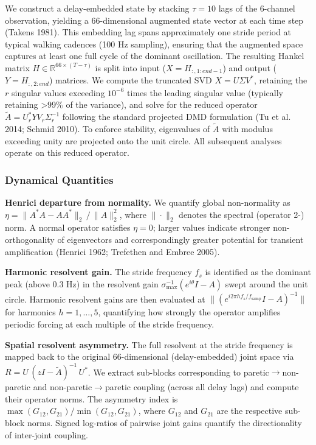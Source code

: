 \documentclass[
  letterpaper,
  DIV=11,
  numbers=noendperiod]{scrartcl}
\begin{document}
We construct a delay-embedded state by stacking \(\tau = 10\) lags of
the 6-channel observation, yielding a \(66\)-dimensional augmented state
vector at each time step (Takens 1981). This embedding lag spans
approximately one stride period at typical walking cadences (100 Hz
sampling), ensuring that the augmented space captures at least one full
cycle of the dominant oscillation. The resulting Hankel matrix
\(H \in \mathbb{R}^{66 \times (T - \tau)}\) is split into input
(\(X = H_{:,1:end-1}\)) and output (\(Y = H_{:,2:end}\)) matrices. We
compute the truncated SVD \(X = U \Sigma V^*\), retaining the \(r\)
singular values exceeding \(10^{-6}\) times the leading singular value
(typically retaining \textgreater99\% of the variance), and solve for
the reduced operator \(\tilde{A} = U_r^* Y V_r \Sigma_r^{-1}\) following
the standard projected DMD formulation (Tu et al. 2014; Schmid 2010). To
enforce stability, eigenvalues of \(\tilde{A}\) with modulus exceeding
unity are projected onto the unit circle. All subsequent analyses
operate on this reduced operator.

\subsubsection{Dynamical Quantities}\label{dynamical-quantities}

\textbf{Henrici departure from normality.} We quantify global
non-normality as \(\eta = \|A^* A - A A^*\|_2 \,/\, \|A\|_2^2\), where
\(\|\cdot\|_2\) denotes the spectral (operator 2-) norm. A normal
operator satisfies \(\eta = 0\); larger values indicate stronger
non-orthogonality of eigenvectors and correspondingly greater potential
for transient amplification (Henrici 1962; Trefethen and Embree 2005).

\textbf{Harmonic resolvent gain.} The stride frequency \(f_s\) is
identified as the dominant peak (above 0.3 Hz) in the resolvent gain
\(\sigma_{\max}^{-1}(e^{i\theta}I - A)\) swept around the unit circle.
Harmonic resolvent gains are then evaluated at
\(\|(e^{i 2\pi h f_s / f_{\text{samp}}} I - A)^{-1}\|\) for harmonics
\(h = 1, \ldots, 5\), quantifying how strongly the operator amplifies
periodic forcing at each multiple of the stride frequency.

\textbf{Spatial resolvent asymmetry.} The full resolvent at the stride
frequency is mapped back to the original \(66\)-dimensional
(delay-embedded) joint space via
\(R = U \,(z I - \tilde{A})^{-1}\, U^*\). We extract sub-blocks
corresponding to paretic\(\to\)non-paretic and non-paretic\(\to\)paretic
coupling (across all delay lags) and compute their operator norms. The
asymmetry index is \(\max(G_{12}, G_{21}) / \min(G_{12}, G_{21})\),
where \(G_{12}\) and \(G_{21}\) are the respective sub-block norms.
Signed log-ratios of pairwise joint gains quantify the directionality of
inter-joint coupling.
\end{document}
